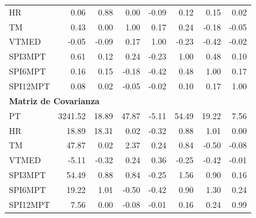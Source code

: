 \begin{table}[ht]
\begin{tabular}{lrrrrrrr}
HR       & 0.06 & 0.88 & 0.00 & -0.09 & 0.12 & 0.15 & 0.02 \\
TM       & 0.43 & 0.00 & 1.00 & 0.17 & 0.24 & -0.18 & -0.05 \\
VTMED    & -0.05 & -0.09 & 0.17 & 1.00 & -0.23 & -0.42 & -0.02 \\
SPI3MPT  & 0.61 & 0.12 & 0.24 & -0.23 & 1.00 & 0.48 & 0.10 \\
SPI6MPT  & 0.16 & 0.15 & -0.18 & -0.42 & 0.48 & 1.00 & 0.17 \\
SPI12MPT & 0.08 & 0.02 & -0.05 & -0.02 & 0.10 & 0.17 & 1.00 \\
\midrule
\multicolumn{8}{l}{\textbf{Matriz de Covarianza}} \\
\midrule
PT       & 3241.52 & 18.89 & 47.87 & -5.11 & 54.49 & 19.22 & 7.56 \\
HR       & 18.89 & 18.31 & 0.02 & -0.32 & 0.88 & 1.01 & 0.00 \\
TM       & 47.87 & 0.02 & 2.37 & 0.24 & 0.84 & -0.50 & -0.08 \\
VTMED    & -5.11 & -0.32 & 0.24 & 0.36 & -0.25 & -0.42 & -0.01 \\
SPI3MPT  & 54.49 & 0.88 & 0.84 & -0.25 & 1.56 & 0.90 & 0.16 \\
SPI6MPT  & 19.22 & 1.01 & -0.50 & -0.42 & 0.90 & 1.30 & 0.24 \\
SPI12MPT & 7.56 & 0.00 & -0.08 & -0.01 & 0.16 & 0.24 & 0.99 \\
\bottomrule
\end{tabular}
\end{table}


